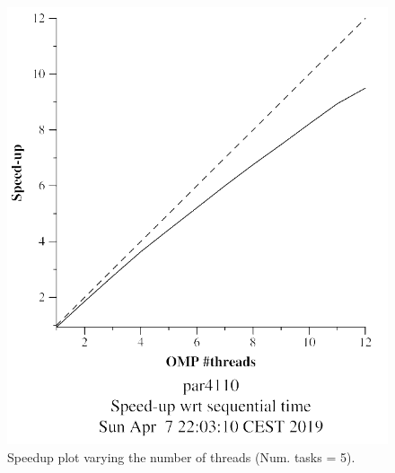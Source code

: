 \documentclass[12pt, a4paper]{article}
\begin{document}
\begin{figure}[H]
\begin{minipage}[b]{0.4\linewidth}
  \includegraphics[scale=0.5]{./mandel-omp-10000-strong-omp-24-5-speedup}
  \caption{Speedup plot varying the number of threads (Num. tasks = 5).}
  \label{fig:mandel-omp-10000-strong-omp-24-5-speedup}
\end{minipage}
\end{figure}
\end{document}
